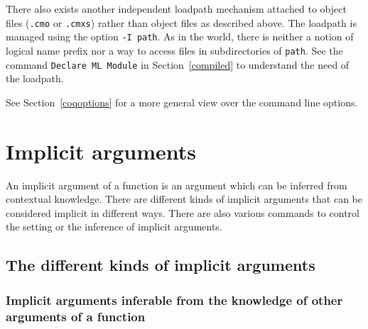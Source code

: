 There also exists another independent loadpath mechanism attached to {\ocaml}
object files (\texttt{.cmo} or \texttt{.cmxs}) rather than {\Coq} object files
as described above. The {\ocaml} loadpath is managed using the option
\texttt{-I path}. As in the {\ocaml} world, there is neither a notion of logical
name prefix nor a way to access files in subdirectories of \texttt{path}.
See the command \texttt{Declare ML Module} in Section~\ref{compiled} to
understand the need of the {\ocaml} loadpath.

See Section~\ref{coqoptions} for a more general view over the {\Coq}
command line options.


\section{Implicit arguments
\label{Implicit Arguments}}

An implicit argument of a function is an argument which can be
inferred from contextual knowledge. There are different kinds of
implicit arguments that can be considered implicit in different
ways. There are also various commands to control the setting or the
inference of implicit arguments.

\subsection{The different kinds of implicit arguments}

\subsubsection{Implicit arguments inferable from the knowledge of other 
arguments of a function}

